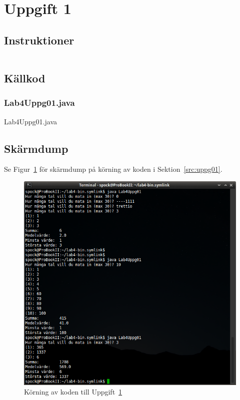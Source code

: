 \section{Uppgift 1}\label{sec:uppg01}

\subsection{Instruktioner}
\begin{Verbatim}[fontsize=\small]
% TODO: Lägg till instruktioner
\end{Verbatim}


\subsection{Källkod}
\subsubsection{Lab4Uppg01.java}
\caption{Lab4Uppg01.java}
\label{src:uppg01}

\subsection{Skärmdump}
Se Figur~\ref{fig:uppg01-screenshot} för skärmdump på körning av koden i
Sektion~\ref{src:uppg01}.

\begin{figure}[htbp]
\centering
\includegraphics[width=\linewidth]{img/01.png}
\caption{Körning av koden till Uppgift~\ref{sec:uppg01}}
\label{fig:uppg01-screenshot}
\end{figure}

